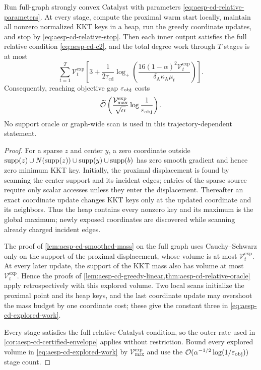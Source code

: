 \begin{theorem}
\label{thm:aesp-cd-explored-volume}
Run full-graph strongly convex Catalyst with parameters
\cref{eq:aesp-cd-relative-parameters}.  At every stage, compute the proximal
warm start locally, maintain all nonzero normalized KKT keys in a heap, run
the greedy coordinate updates, and stop by
\cref{eq:aesp-cd-relative-stop}.  Then each inner output satisfies the full
relative condition \cref{eq:aesp-cd-c2}, and the total degree work through
$T$ stages is at most
\begin{equation}
 \sum_{t=1}^T \mathcal V_t^{\mathrm{exp}}
 \left[
  3+\frac{1}{2\tau_{\mathrm{cd}}}
  \log_+\left(
   \frac{16(1-\alpha)^2\mathcal V_t^{\mathrm{exp}}}
        {\delta_{\mathrm A}\kappa_{\mathrm A}\mu_t}
  \right)\right].
 \label{eq:aesp-cd-explored-work}
\end{equation}
Consequently, reaching objective gap $\varepsilon_{\mathrm{obj}}$ costs
\begin{equation}
 \widetilde{\mathcal{O}}\left(
   \frac{\mathcal V_{\max}^{\mathrm{exp}}}{\sqrt\alpha}
   \log\frac1{\varepsilon_{\mathrm{obj}}}
 \right).
 \label{eq:aesp-cd-explored-rate}
\end{equation}
No support oracle or graph-wide scan is used in this trajectory-dependent
statement.
\end{theorem}

\begin{proof}
For a sparse $z$ and center $y$, a zero coordinate outside
$\operatorname{supp}(z)\cup N(\operatorname{supp}(z))\cup\operatorname{supp}(y)\cup\operatorname{supp}(b)$ has zero smooth gradient
and hence zero minimum KKT key.  Initially, the proximal displacement is
found by scanning the center support and its incident edges; entries of the
sparse source require only scalar accesses unless they enter the displacement.
Thereafter an exact coordinate update changes KKT keys only at the
updated coordinate and its neighbors.  Thus the heap contains every nonzero
key and its maximum is the global maximum; newly exposed coordinates are
discovered while scanning already charged incident edges.

The proof of \cref{lem:aesp-cd-smoothed-mass} on the full graph uses
Cauchy--Schwarz only on the support of the proximal displacement, whose
volume is at most $\mathcal V_t^{\mathrm{exp}}$.  At every later update, the
support of the KKT mass also has volume at most
$\mathcal V_t^{\mathrm{exp}}$.  Hence the proofs of
\cref{lem:aesp-cd-greedy-linear,thm:aesp-cd-relative-oracle} apply
retrospectively with this explored volume.  Two local scans initialize the
proximal point and its heap keys, and the last coordinate update may overshoot
the mass budget by one coordinate cost; these give the constant three in
\cref{eq:aesp-cd-explored-work}.

Every stage satisfies the full relative Catalyst condition, so the outer
rate used in \cref{cor:aesp-cd-certified-envelope} applies without
restriction.  Bound every explored volume in
\cref{eq:aesp-cd-explored-work} by
$\mathcal V_{\max}^{\mathrm{exp}}$ and use the
$\mathcal{O}(\alpha^{-1/2}\log(1/\varepsilon_{\mathrm{obj}}))$ stage count.
\end{proof}


